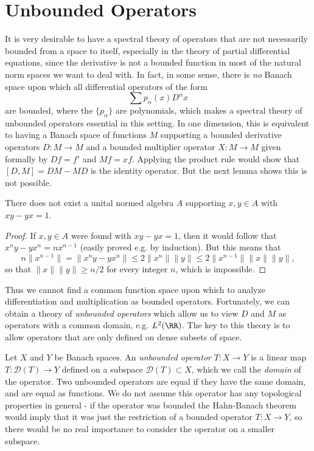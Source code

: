 \chapter{Unbounded Operators}

It is very desirable to have a spectral theory of operators that are not necessarily bounded from a space to itself, especially in the theory of partial differential equations, since the derivative is not a bounded function in most of the natural norm spaces we want to deal with. In fact, in some sense, there is \emph{no} Banach space upon which all differential operators of the form
%
\[ \sum p_\alpha(x) D^\alpha x \]
%
are bounded, where the $\{ p_\alpha \}$ are polynomials, which makes a spectral theory of unbounded operators essential in this setting. In one dimension, this is equivalent to having a Banach space of functions $M$ supporting a bounded derivative operators $D: M \to M$ and a bounded multiplier operator $X: M \to M$ given formally by $Df = f'$ and $Mf = xf$. Applying the product rule would show that $[D,M] = DM - MD$ is the identity operator. But the next lemma shows this is not possible.

\begin{lemma}
    There does not exist a unital normed algebra $A$ supporting $x,y \in A$ with $xy - yx = 1$.
\end{lemma}
\begin{proof}
    If $x,y \in A$ were found with $xy - yx = 1$, then it would follow that $x^n y - yx^n = nx^{n-1}$ (easily proved e.g. by induction). But this means that
    \[ n \| x^{n-1} \| = \| x^n y - yx^n \| \leq 2 \| x^n \| \| y \| \leq 2 \| x^{n-1} \| \| x \| \| y \|, \]
    so that $\| x \| \| y \| \geq n/2$ for every integer $n$, which is impossible.
\end{proof}

Thus we cannot find a common function space upon which to analyze differentiation and multiplication as bounded operators. Fortunately, we can obtain a theory of \emph{unbounded operators} which allow us to view $D$ and $M$ as operators with a common domain, e.g. $L^2(\RR)$. The key to this theory is to allow operators that are only defined on dense subsets of space.

Let $X$ and $Y$ be Banach spaces. An \emph{unbounded operator} $T: X \to Y$ is a linear map $T: \mathcal{D}(T) \to Y$ defined on a subspace $\mathcal{D}(T) \subset X$, which we call the \emph{domain} of the operator. Two unbounded operators are equal if they have the same domain, and are equal as functions. We do not assume this operator has any topological properties in general - if the operator was bounded the Hahn-Banach theorem would imply that it was just the restriction of a bounded operator $T: X \to Y$, so there would be no real importance to consider the operator on a smaller subspace.

